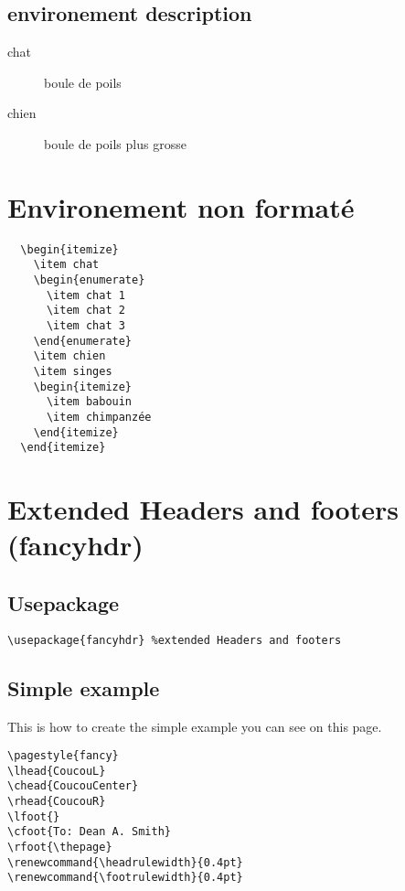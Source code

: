 \documentclass[a4paper,12pt]{article}
\begin{document}
\subsection{environement description}
\begin{description}
  \item[chat] boule de poils
  \item[chien] boule de poils plus grosse \blindtext
\end{description}


\newpage
\section{Environement non formaté}
\begin{verbatim}
  \begin{itemize}
    \item chat
    \begin{enumerate}
      \item chat 1
      \item chat 2
      \item chat 3
    \end{enumerate}
    \item chien
    \item singes
    \begin{itemize}
      \item babouin
      \item chimpanzée
    \end{itemize}
  \end{itemize}
\end{verbatim}

\newpage
\section{Extended Headers and footers (fancyhdr)}
\subsection{Usepackage}
\begin{verbatim}
\usepackage{fancyhdr} %extended Headers and footers
\end{verbatim}

\subsection{Simple example}
This is how to create the simple example you can see on this page.
\begin{verbatim}
\pagestyle{fancy}
\lhead{CoucouL}
\chead{CoucouCenter}
\rhead{CoucouR}
\lfoot{}
\cfoot{To: Dean A. Smith}
\rfoot{\thepage}
\renewcommand{\headrulewidth}{0.4pt}
\renewcommand{\footrulewidth}{0.4pt}
\end{verbatim}
\pagestyle{fancy}
\lfoot{}
\rfoot{\thepage}
\renewcommand{\headrulewidth}{0.4pt}
\renewcommand{\footrulewidth}{0.4pt}
\end{document}
